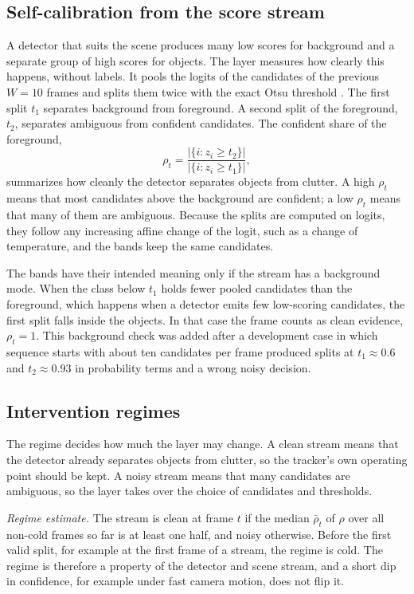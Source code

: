 \documentclass[pdflatex,sn-mathphys-num,iicol]{sn-jnl}
\begin{document}
\subsection{Self-calibration from the score stream}\label{sec:calib}
A detector that suits the scene produces many low scores for background and a
separate group of high scores for objects. The layer measures how clearly
this happens, without labels. It pools the logits of the candidates of the
previous $W=10$ frames and splits them twice with the exact Otsu threshold
\cite{otsu1979}. The first
split $t_1$ separates background from foreground. A second split of the
foreground, $t_2$, separates ambiguous from confident candidates. The
confident share of the foreground,
\begin{equation}
\rho_t=\frac{\left|\{i: z_i\ge t_2\}\right|}{\left|\{i: z_i\ge t_1\}\right|},
\label{eq:rho}
\end{equation}
summarizes how cleanly the detector separates objects from clutter. A high
$\rho_t$ means that most candidates above the background are confident; a low
$\rho_t$ means that many of them are ambiguous. Because
the splits are computed on logits, they follow any increasing affine change
of the logit, such as a change of temperature, and the bands keep the same
candidates.

The bands have their intended meaning only if the stream has a background
mode. When the class below $t_1$ holds fewer pooled candidates than the
foreground, which happens when a detector emits few low-scoring candidates, the
first split falls inside the objects. In that case the frame counts as clean
evidence, $\rho_t=1$. This background check was added after a development
case in which sequence starts with about ten candidates per frame produced
splits at $t_1\approx0.6$ and $t_2\approx0.93$ in probability terms and a
wrong noisy decision.

\subsection{Intervention regimes}\label{sec:regimes}
The regime decides how much the layer may change. A clean stream means that
the detector already separates objects from clutter, so the tracker's own
operating point should be kept. A noisy stream means that many candidates are
ambiguous, so the layer takes over the choice of candidates and thresholds.

\emph{Regime estimate.} The stream is clean at frame $t$ if the median
$\bar\rho_t$ of $\rho$ over all non-cold frames so far is at least one half,
and noisy otherwise. Before the first valid split, for example at the first
frame of a stream, the regime is cold. The regime is therefore a property of
the detector and scene stream, and a short dip in confidence, for example under fast camera
motion, does not flip it.
\end{document}
